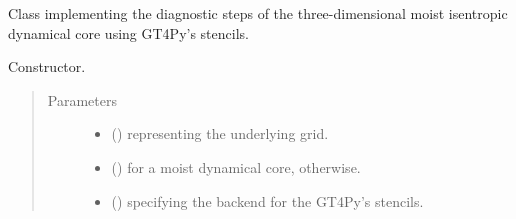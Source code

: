 \documentclass[letterpaper,10pt,english]{sphinxmanual}
\begin{document}
\begin{fulllineitems}
\label{\detokenize{api:dycore.diagnostic_isentropic.DiagnosticIsentropic}}
Class implementing the diagnostic steps of the three-dimensional moist isentropic dynamical core
using GT4Py’s stencils.

\begin{fulllineitems}
\label{\detokenize{api:dycore.diagnostic_isentropic.DiagnosticIsentropic.__init__}}
Constructor.
\begin{quote}\begin{description}
\item[{Parameters}] \leavevmode\begin{itemize}
\item {} 
 () \textendash{} {\hyperref[\detokenize{api:grids.grid_xyz.GridXYZ}]{}} representing the underlying grid.

\item {} 
 () \textendash{}  for a moist dynamical core,  otherwise.

\item {} 
 () \textendash{}  specifying the backend for the GT4Py’s stencils.

\end{itemize}

\end{description}\end{quote}

\end{fulllineitems}



\end{fulllineitems}
\end{document}
